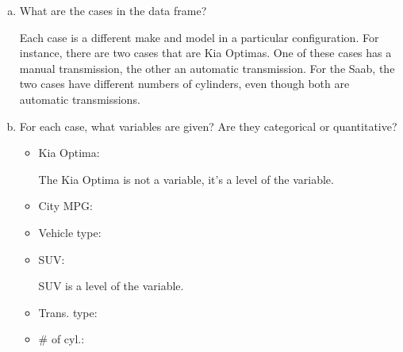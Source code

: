 \begin{enumerate}[(a)]
\item What are the cases in the data frame?  

\begin{MultipleChoice}
\end{MultipleChoice}

\begin{AnswerText}
Each case is a different make and model in a particular
configuration.  For instance, there are two cases that are Kia
Optimas.  One of these cases has a manual transmission, the other an
automatic transmission.  For the Saab, the two cases have different
numbers of cylinders, even though both are automatic transmissions.
\end{AnswerText}

\item For each case, what variables are given?  Are they categorical 
or quantitative?

\begin{itemize}
\item Kia Optima:

\begin{AnswerText}
The Kia Optima is not a variable, it's a level of the  variable.
\end{AnswerText}

\item City MPG: 

\item Vehicle type: 

\item SUV:  

\begin{AnswerText}
SUV is a level of the  variable.
\end{AnswerText}

\item Trans. type: 

\item \# of cyl.: 
\end{itemize}


\end{enumerate}

